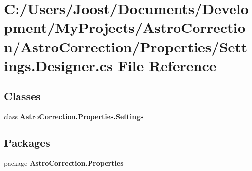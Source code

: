 \section{C:/Users/Joost/Documents/Development/MyProjects/AstroCorrection/AstroCorrection/Properties/Settings.Designer.cs File Reference}
\label{_settings_8_designer_8cs}
\subsection*{Classes}
\begin{DoxyCompactItemize}
\item 
class {\bf AstroCorrection.Properties.Settings}
\end{DoxyCompactItemize}
\subsection*{Packages}
\begin{DoxyCompactItemize}
\item 
package {\bf AstroCorrection.Properties}
\end{DoxyCompactItemize}
